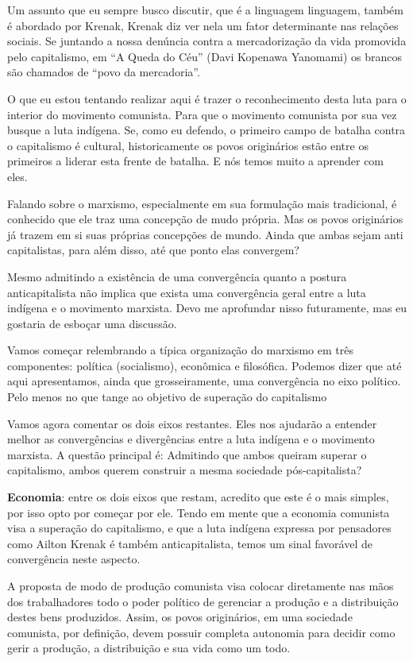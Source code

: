 Um assunto que eu sempre busco discutir, que é a linguagem linguagem, também é abordado por Krenak, Krenak diz ver nela um fator determinante nas relações sociais. Se juntando a nossa denúncia contra a mercadorização da vida promovida pelo capitalismo, em “A Queda do Céu” (Davi Kopenawa Yanomami) os brancos são chamados de “povo da mercadoria”.

O que eu estou tentando realizar aqui é trazer o reconhecimento desta luta para o interior do movimento comunista. Para que o movimento comunista por sua vez busque a luta indígena. Se, como eu defendo, o primeiro campo de batalha contra o capitalismo é cultural, historicamente os povos originários estão entre os primeiros a liderar esta frente de batalha. E nós temos muito a aprender com eles.

Falando sobre o marxismo, especialmente em sua formulação mais tradicional, é conhecido que ele traz uma concepção de mudo própria. Mas os povos originários já trazem em si suas próprias concepções de mundo. Ainda que ambas sejam anti capitalistas, para além disso, até que ponto elas convergem?

Mesmo admitindo a existência de uma convergência quanto a postura anticapitalista não implica que exista uma convergência geral entre a luta indígena e o movimento marxista. Devo me aprofundar nisso futuramente, mas eu gostaria de esboçar uma discussão.

Vamos começar relembrando a típica organização do marxismo em três componentes: política (socialismo), econômica e filosófica. Podemos dizer que até aqui apresentamos, ainda que grosseiramente, uma convergência no eixo político. Pelo menos no que tange ao objetivo de superação do capitalismo

Vamos agora comentar os dois eixos restantes. Eles nos ajudarão a entender melhor as convergências e divergências entre a luta indígena e o movimento marxista. A questão principal é: Admitindo que ambos queiram superar o capitalismo, ambos querem construir a mesma sociedade pós-capitalista?

\textbf{Economia}: entre os dois eixos que restam, acredito que este é o mais simples, por isso opto por começar por ele. Tendo em mente que a economia comunista visa a superação do capitalismo, e que a luta indígena expressa por pensadores como Ailton Krenak é também anticapitalista, temos um sinal favorável de convergência neste aspecto.

A proposta de modo de produção comunista visa colocar diretamente nas mãos dos trabalhadores todo o poder político de gerenciar a produção e a distribuição destes bens produzidos. Assim, os povos originários, em uma sociedade comunista, por definição, devem possuir completa autonomia para decidir como gerir a produção, a distribuição e sua vida como um todo.

